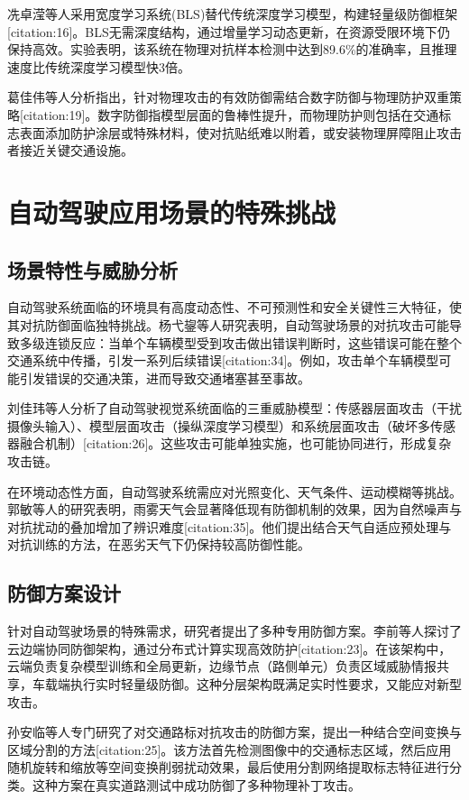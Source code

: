 \documentclass[acmtog]{ctexart}
\begin{document}
冼卓滢等人采用宽度学习系统(BLS)替代传统深度学习模型，构建轻量级防御框架[citation:16]。BLS无需深度结构，通过增量学习动态更新，在资源受限环境下仍保持高效。实验表明，该系统在物理对抗样本检测中达到89.6\%的准确率，且推理速度比传统深度学习模型快3倍。

葛佳伟等人分析指出，针对物理攻击的有效防御需结合数字防御与物理防护双重策略[citation:19]。数字防御指模型层面的鲁棒性提升，而物理防护则包括在交通标志表面添加防护涂层或特殊材料，使对抗贴纸难以附着，或安装物理屏障阻止攻击者接近关键交通设施。

\section{自动驾驶应用场景的特殊挑战}

\subsection{场景特性与威胁分析}

自动驾驶系统面临的环境具有高度动态性、不可预测性和安全关键性三大特征，使其对抗防御面临独特挑战。杨弋鋆等人研究表明，自动驾驶场景的对抗攻击可能导致多级连锁反应：当单个车辆模型受到攻击做出错误判断时，这些错误可能在整个交通系统中传播，引发一系列后续错误[citation:34]。例如，攻击单个车辆模型可能引发错误的交通决策，进而导致交通堵塞甚至事故。

刘佳玮等人分析了自动驾驶视觉系统面临的三重威胁模型：传感器层面攻击（干扰摄像头输入）、模型层面攻击（操纵深度学习模型）和系统层面攻击（破坏多传感器融合机制）[citation:26]。这些攻击可能单独实施，也可能协同进行，形成复杂攻击链。

在环境动态性方面，自动驾驶系统需应对光照变化、天气条件、运动模糊等挑战。郭敏等人的研究表明，雨雾天气会显著降低现有防御机制的效果，因为自然噪声与对抗扰动的叠加增加了辨识难度[citation:35]。他们提出结合天气自适应预处理与对抗训练的方法，在恶劣天气下仍保持较高防御性能。

\subsection{防御方案设计}

针对自动驾驶场景的特殊需求，研究者提出了多种专用防御方案。李前等人探讨了云边端协同防御架构，通过分布式计算实现高效防护[citation:23]。在该架构中，云端负责复杂模型训练和全局更新，边缘节点（路侧单元）负责区域威胁情报共享，车载端执行实时轻量级防御。这种分层架构既满足实时性要求，又能应对新型攻击。

孙安临等人专门研究了对交通路标对抗攻击的防御方案，提出一种结合空间变换与区域分割的方法[citation:25]。该方法首先检测图像中的交通标志区域，然后应用随机旋转和缩放等空间变换削弱扰动效果，最后使用分割网络提取标志特征进行分类。这种方案在真实道路测试中成功防御了多种物理补丁攻击。
\end{document}
